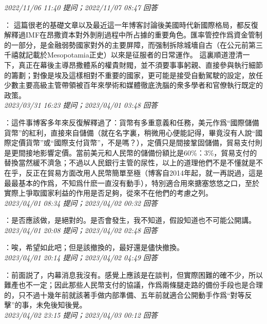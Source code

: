 \documentclass[twocolumn]{ctexart}
\begin{document}
\textit{\hfill\noindent\small 2022/11/06 11:40 提问；2022/11/07 08:47 回答}

：
這篇很老的基礎文章以及最近這一年博客討論後美國時代新國際格局，都反復解釋過IMF在昂撒資本對外剝削過程中所占據的重要角色。匯率管控作爲資金管制的一部分，是金融弱勢國家對外的主要屏障，而强制拆除城墻自古（在公元前第三千禧就記載於Mesopotamia正史）以來是征服者的日常運作。
這裏順道澄清一下，真正在幕後主導昂撒體系的權貴財閥，並不須要事事躬親、直接參與執行細節的籌劃；對像是埃及這樣相對不重要的國家，更可能是接受自動駕駛的設定，放任少數主要高級主管帶領被百年來學術和媒體徹底洗腦的衆多學者和官僚執行既定的政策。
\\

\textit{\hfill\noindent\small 2023/03/31 16:23 提问；2023/04/01 03:48 回答}

：這件事博客多年來反復解釋過了：貨幣有多重意義和任務，美元作爲“國際儲備貨幣”的紅利，直接來自儲備（就在名字裏，稍微用心便能記得，畢竟沒有人說“國際定價貨幣”或“國際支付貨幣”，不是嗎？），定價只是間接鞏固儲備，貿易支付則是更間接地影響定價。當前美元和人民幣的儲備份額比是60\%：3\%，貿易支付的替換當然緩不濟急；不過以人民銀行主管的尿性，以上的道理他們不是不懂就是不在乎，反正在貿易方面改用人民幣簡單至極（博客自2014年起，就一再説過，這是最最基本的作爲，不知爲什麽一直沒有動手），特別適合用來搪塞悠悠之口，至於實際上爭取國家利益的作用是否足夠，從來不在他們的考慮之列。
\\

\textit{\hfill\noindent\small 2023/04/01 08:34 提问；2023/04/02 00:32 回答}

：是否應該做，是絕對的。是否會發生，我不知道，假設知道也不可能公開講。
\\

\textit{\hfill\noindent\small 2023/04/01 20:08 提问；2023/04/02 02:48 回答}

：唉，希望如此吧；但是該撤換的，最好還是儘快撤換。
\\

\textit{\hfill\noindent\small 2023/04/01 20:14 提问；2023/04/02 04:49 回答}

：前面説了，内幕消息我沒有。感覺上應該是在談判，但實際困難的確不少，所以難產也不一定；因此那些人民幣支付的協議，作爲兩條腿走路的備份手段也是合理的，只不過十幾年前就該著手做内部準備、五年前就適合公開動手作爲“對等反擊”的事，未免後知後覺。
\\

\textit{\hfill\noindent\small 2023/04/02 23:15 提问；2023/04/03 00:12 回答}
\end{document}
